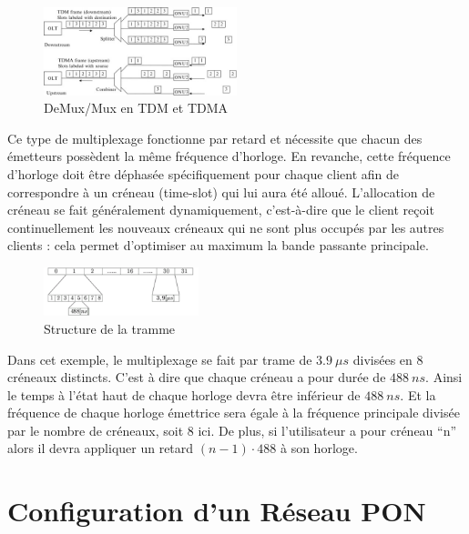 \documentclass[oneside]{book}
\begin{document}
		\begin{figure}[ht!]
			\centering
			\includegraphics[width=0.5\textwidth]{./object/TDM-A.jpg}
			\caption{DeMux/Mux en TDM et TDMA}
		\end{figure}

		Ce type de multiplexage fonctionne par retard et nécessite que chacun des émetteurs possèdent la même fréquence d’horloge. En revanche, cette fréquence d’horloge doit être déphasée spécifiquement pour chaque client afin de correspondre à un créneau (time-slot) qui lui aura été alloué. L’allocation de créneau se fait généralement dynamiquement, c’est-à-dire que le client reçoit continuellement les nouveaux créneaux qui ne sont plus occupés par les autres clients : cela permet d’optimiser au maximum la bande passante principale.

		\newpage

		\begin{figure}[ht!]
			\centering
			\includegraphics[width=0.4\textwidth]{./object/TDM2.png}
			\caption{Structure de la tramme}
		\end{figure}

		Dans cet exemple, le multiplexage se fait par trame de $3.9\ \mu s$ divisées en 8 créneaux distincts. C’est à dire que chaque créneau a pour durée de $488\ ns$. Ainsi le temps à l’état haut de chaque horloge devra être inférieur de $488\ ns$. Et la fréquence de chaque horloge émettrice sera égale à la fréquence principale divisée par le nombre de créneaux, soit 8 ici. De plus, si l’utilisateur a pour créneau “n” alors il devra appliquer un retard $(n-1)\cdot 488$ à son horloge\cite{cours}.


\chapter{Configuration d'un Réseau PON}

	\vspace{-40pt}
	
\end{document}
